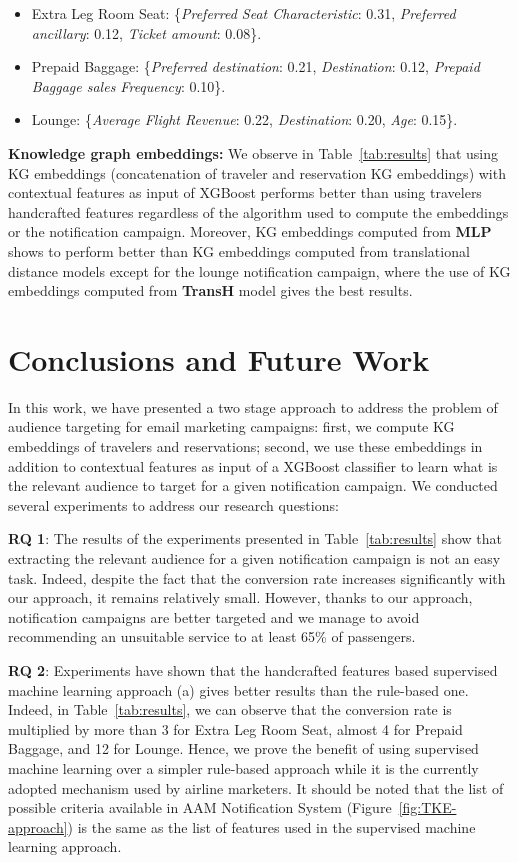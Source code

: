\documentclass[11pt,dvipdfm]{article}
\begin{document}
\begin{itemize}
    \item Extra Leg Room Seat: \{\textit{Preferred Seat Characteristic}: 0.31,  \textit{Preferred ancillary}: 0.12,  \textit{Ticket amount}: 0.08\}.
    \item Prepaid Baggage: \{\textit{Preferred destination}: 0.21,  \textit{Destination}: 0.12,  \textit{Prepaid Baggage sales Frequency}: 0.10\}.
    \item Lounge: \{\textit{Average Flight Revenue}: 0.22,  \textit{Destination}: 0.20,  \textit{Age}: 0.15\}.
\end{itemize}

\textbf{Knowledge graph embeddings:}
We observe in Table~\ref{tab:results} that using KG embeddings (concatenation of traveler and reservation KG embeddings) with contextual features as input of XGBoost performs better than using travelers handcrafted features regardless of the algorithm used to compute the embeddings or the notification campaign. Moreover, KG embeddings computed from \textbf{MLP} shows to perform better than KG embeddings computed from translational distance models except for the lounge notification campaign, where the use of KG embeddings computed from \textbf{TransH} model gives the best results. 

\section{Conclusions and Future Work}
\label{sec:conclusion}
In this work, we have presented a two stage approach to address the problem of audience targeting for email marketing campaigns: first, we compute KG embeddings of travelers and reservations; second, we use these embeddings in addition to contextual features as input of a XGBoost classifier to learn what is the relevant audience to target for a given notification campaign. We conducted several experiments to address our research questions:

\textbf{RQ 1}: The results of the experiments presented in Table~\ref{tab:results} show that extracting the relevant audience for a given notification campaign is not an easy task. Indeed, despite the fact that the conversion rate increases significantly with our approach, it remains relatively small. However, thanks to our approach, notification campaigns are better targeted and we manage to avoid recommending an unsuitable service to at least 65\% of passengers. 

\textbf{RQ 2}: Experiments have shown that the handcrafted features based supervised machine learning approach (a) gives better results than the rule-based one. Indeed, in Table~\ref{tab:results}, we can observe that the conversion rate is multiplied by more than 3 for Extra Leg Room Seat, almost 4 for Prepaid Baggage, and 12 for Lounge. Hence, we prove the benefit of using supervised machine learning over a simpler rule-based approach while it is the currently adopted mechanism used by airline marketers. It should be noted that the list of possible criteria available in AAM Notification System (Figure~\ref{fig:TKE-approach}) is the same as the list of features used in the supervised machine learning approach. 
\end{document}
